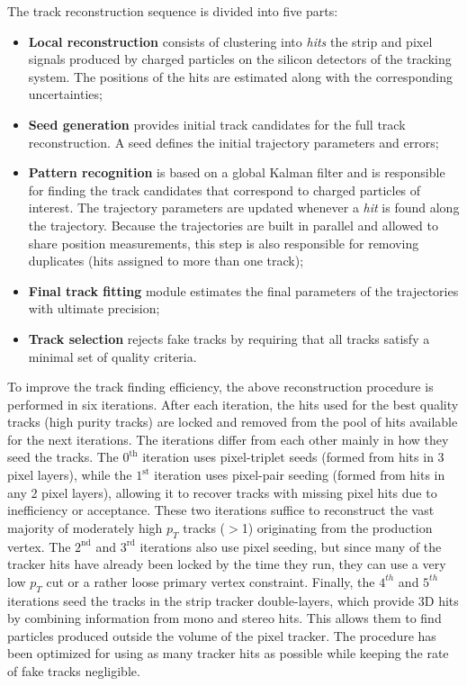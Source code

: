 The track reconstruction sequence is divided into five parts:
\begin{itemize}
\item \textbf{Local reconstruction} consists of clustering into \textit{hits}
the strip and pixel signals produced by charged particles on the silicon
detectors of the tracking system. The positions of the hits are estimated along
with the corresponding uncertainties;
\item \textbf{Seed generation} provides initial track candidates for the full
track reconstruction. A seed defines the initial trajectory parameters and errors;
\item \textbf{Pattern recognition} is based on a global Kalman filter \cite{Fruhwirth:1987fm}
 and
is responsible for finding the track candidates that correspond to charged
particles of interest. The trajectory parameters are updated whenever a \textit{hit} is found
along the trajectory. Because the trajectories are built in parallel and allowed to share position
measurements, this step is also responsible for removing duplicates (hits assigned to more than one track);
\item \textbf{Final track fitting} module estimates the final parameters of the trajectories
with ultimate precision;
\item \textbf{Track selection} rejects fake tracks by requiring that 
all tracks satisfy a minimal set of quality criteria.
\end{itemize}

To improve the track finding efficiency, the above reconstruction procedure is
performed in six iterations. After each iteration, the hits
used for the best quality tracks (high purity tracks) are
locked and removed from the pool of hits available for the next iterations.
The iterations differ from each other mainly in how they
seed the tracks.
 The $0^\mathrm{th}$ iteration uses pixel-triplet seeds (formed from
hits in 3 pixel layers), while the $1^\mathrm{st}$ iteration uses pixel-pair seeding
(formed from hits in any 2 pixel layers), allowing it to recover tracks with
missing pixel hits due to inefficiency or acceptance. These two iterations
suffice to reconstruct the vast majority of moderately high $p_T$ tracks ($>$1\GeV)
originating from the production vertex. The $2^\mathrm{nd}$ and $3^\mathrm{rd}$ iterations
also use pixel seeding, but since many of the tracker hits have already been
locked by the time they run, they can use a very low $p_T$ cut or a rather
loose primary vertex constraint. Finally, the $4^{th}$ and $5^{th}$
iterations seed the tracks in the strip tracker double-layers, which provide 3D
hits by combining information from mono and stereo hits. This allows them to
find particles produced outside the volume of the pixel tracker. The procedure has been optimized for using as
many tracker hits as possible while keeping the rate of fake tracks negligible.

